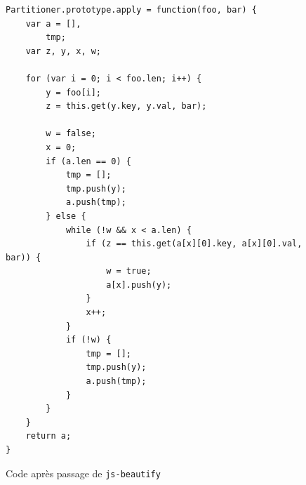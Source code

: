 \begin{figure}[H]
\begin{lstlisting}
Partitioner.prototype.apply = function(foo, bar) {
    var a = [],
        tmp;
    var z, y, x, w;

    for (var i = 0; i < foo.len; i++) {
        y = foo[i];
        z = this.get(y.key, y.val, bar);

        w = false;
        x = 0;
        if (a.len == 0) {
            tmp = [];
            tmp.push(y);
            a.push(tmp);
        } else {
            while (!w && x < a.len) {
                if (z == this.get(a[x][0].key, a[x][0].val, bar)) {
                    w = true;
                    a[x].push(y);
                }
                x++;
            }
            if (!w) {
                tmp = [];
                tmp.push(y);
                a.push(tmp);
            }
        }
    }
    return a;
}
\end{lstlisting}
\caption{Code après passage de {\tt js-beautify}}
\end{figure}
